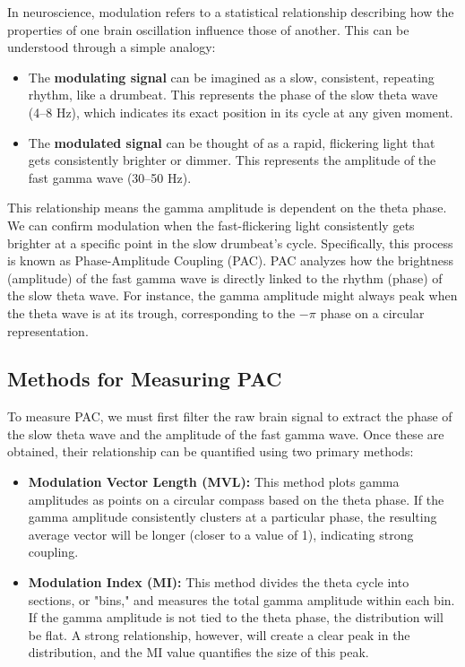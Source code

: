 \documentclass[hidelinks,12pt]{article}
\begin{document}
	In neuroscience, modulation refers to a statistical relationship describing how the properties of one brain oscillation influence those of another. This can be understood through a simple analogy:
	
	\begin{itemize}
	\item The \textbf{modulating signal} can be imagined as a slow, consistent, repeating rhythm, like a drumbeat. This represents the phase of the slow theta wave (4--8 Hz), which indicates its exact position in its cycle at any given moment.
	
	\item The \textbf{modulated signal} can be thought of as a rapid, flickering light that gets consistently brighter or dimmer. This represents the amplitude of the fast gamma wave (30--50 Hz).
	\end{itemize}
	
	This relationship means the gamma amplitude is dependent on the theta phase. We can confirm modulation when the fast-flickering light consistently gets brighter at a specific point in the slow drumbeat's cycle.
	\bigbreak
	Specifically, this process is known as Phase-Amplitude Coupling (PAC). PAC analyzes how the brightness (amplitude) of the fast gamma wave is directly linked to the rhythm (phase) of the slow theta wave. For instance, the gamma amplitude might always peak when the theta wave is at its trough, corresponding to the $-\pi$ phase on a circular representation.
	
	\subsection{Methods for Measuring PAC}
	
	To measure PAC, we must first filter the raw brain signal to extract the phase of the slow theta wave and the amplitude of the fast gamma wave. Once these are obtained, their relationship can be quantified using two primary methods:
	
	\begin{itemize}
		\item \textbf{Modulation Vector Length (MVL):} This method plots gamma amplitudes as points on a circular compass based on the theta phase. If the gamma amplitude consistently clusters at a particular phase, the resulting average vector will be longer (closer to a value of 1), indicating strong coupling.
		
		\item \textbf{Modulation Index (MI):}  This method divides the theta cycle into sections, or "bins," and measures the total gamma amplitude within each bin. If the gamma amplitude is not tied to the theta phase, the distribution will be flat. A strong relationship, however, will create a clear peak in the distribution, and the MI value quantifies the size of this peak.
	\end{itemize}
	
\end{document}
